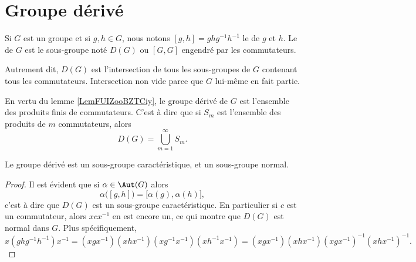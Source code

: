 \section{Groupe dérivé}

\begin{definition}\label{DefVUFBooNQjEdn}
    Si \( G\) est un groupe et si \( g,h\in G\), nous notons \( [g,h]=ghg^{-1}h^{-1}\) le  de \( g\) et \( h\). Le  de \( G\) est le sous-groupe noté \( D(G)\) ou \( [G,G]\) engendré par les commutateurs.
\end{definition}
Autrement dit, \( D(G)\) est l'intersection de tous les sous-groupes de \( G\) contenant tous les commutateurs. Intersection non vide parce que \( G\) lui-même en fait partie.

En vertu du lemme \ref{LemFUIZooBZTCiy}, le groupe dérivé de \( G\) est l'ensemble des produits finis de commutateurs. C'est à dire que si \( S_m\) est l'ensemble des produits de \( m\) commutateurs, alors
\begin{equation}
    D(G)=\bigcup_{m=1}^{\infty}S_m.
\end{equation}

\begin{lemma}   \label{LemMMOCooDJJJhy}
    Le groupe dérivé est un sous-groupe caractéristique, et un sous-groupe normal.
\end{lemma}

\begin{proof}
    Il est évident que si \( \alpha\in\Aut(G)\) alors 
    \begin{equation}
        \alpha\big( [g,h] \big)=\big[ \alpha(g),\alpha(h) \big],
    \end{equation}
    c'est à dire que \( D(G)\) est un sous-groupe caractéristique. En particulier si \( c\) est un commutateur, alors \( xcx^{-1}\) en est encore un, ce qui montre que \( D(G)\) est normal dans \( G\). Plus spécifiquement,
    \begin{equation}
        x(ghg^{-1}h^{-1})x^{-1}=(xgx^{-1})(xhx^{-1})(xg^{-1}x^{-1})(xh^{-1}x^{-1})=(xgx^{-1})(xhx^{-1})(xgx^{-1})^{-1}(xhx^{-1})^{-1}.
    \end{equation}
\end{proof}

